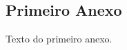 \begin{anexosenv}

\partanexos

\chapter{Primeiro Anexo}

Texto do primeiro anexo.

\end{anexosenv}

